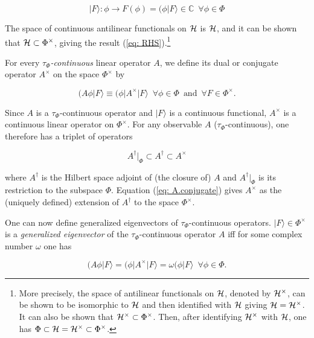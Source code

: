 \documentclass[12pt]{article}
\begin{document}
\begin{equation}
|F\rangle : \phi \rightarrow F(\phi) = (\phi | F\rangle \in \mathbb{C} \,\,\, \forall \phi \in \Phi
\end{equation}

\noindent The space of continuous antilinear functionals on ${\cal H}$ is ${\cal H}$, and it can be shown that ${\cal H} \subset \Phi^{\times}$, giving the result (\ref{eq: RHS}).\footnote{More precisely, the space of antilinear functionals on ${\cal H}$, denoted by ${\cal H}^{\times}$, can be shown to be isomorphic to ${\cal H}$ and then identified with ${\cal H}$ giving ${\cal H} = {\cal H}^{\times}$.  It can also be shown that ${\cal H}^{\times} \subset \Phi^{\times}$.  Then, after identifying ${\cal H}^{\times}$ with ${\cal H}$, one has $\Phi \subset {\cal H} = {\cal H}^{\times} \subset \Phi^{\times}$.}

For every {\it $\tau_{\Phi}$-continuous} linear operator $A$, we define its dual or conjugate operator $A^{\times}$ on the space $\Phi^{\times}$ by

\begin{equation}
(A\phi | F\rangle \equiv (\phi | A^{\times} | F\rangle \,\,\, \forall \phi \in \Phi \,\,\, \mbox{and} \,\,\, \forall F \in \Phi^{\times}.  \label{eq: A.conjugate}
\end{equation}

\noindent Since $A$ is a $\tau_{\Phi}$-continuous operator and $|F\rangle$ is a continuous functional, $A^{\times}$ is a continuous linear operator on $\Phi^{\times}$.  For any observable $A$ ($\tau_{\Phi}$-continuous), one therefore has a triplet of operators

\begin{equation}
A^{\dagger}|_{\Phi} \subset A^{\dagger} \subset A^{\times}
\end{equation}

\noindent where $A^{\dagger}$ is the Hilbert space adjoint of (the closure of) $A$ and $A^{\dagger}|_{\Phi}$ is its restriction to the subspace $\Phi$.  Equation (\ref{eq: A.conjugate}) gives $A^{\times}$ as the (uniquely defined) extension of $A^{\dagger}$ to the space $\Phi^{\times}$.

One can now define generalized eigenvectors of $\tau_{\Phi}$-continuous operators.  $|F\rangle \in \Phi^{\times}$ is a {\it generalized eigenvector} of the $\tau_{\Phi}$-continuous operator $A$ iff for some complex number $\omega$ one has

\begin{equation}
(A\phi | F\rangle = (\phi | A^{\times} | F\rangle = \omega (\phi | F\rangle \,\,\, \forall \phi \in \Phi.      \label{eq: geneigenvalue}
\end{equation}
\end{document}
